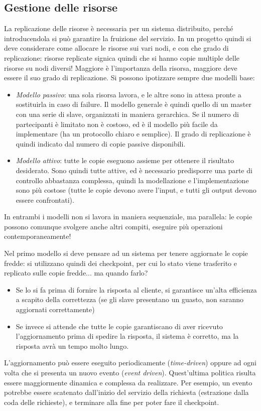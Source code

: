 \subsection{Gestione delle risorse}
La replicazione delle risorse è necessaria per un sistema distribuito, perché introducendola si può garantire la
fruizione del servizio. In un progetto quindi si deve considerare come allocare le risorse sui vari nodi, e con che
grado di replicazione: risorse replicate signica quindi che si hanno copie multiple delle risorse su nodi diversi!
Maggiore è l'importanza della risorsa, maggiore deve essere il suo grado di replicazione.
Si possono ipotizzare sempre due modelli base:
\begin{itemize}
 \item \textit{Modello passivo}: una sola risorsa lavora, e le altre sono in attesa pronte a sostituirla in caso di
 failure. Il modello generale è quindi quello di un master con una serie di slave, organizzati in maniera gerarchica.
 Se il numero di partecipanti è limitato non è costoso, ed è il modello più facile da implementare (ha un protocollo
 chiaro e semplice). Il grado di replicazione è quindi indicato dal numero di copie passive disponibili.
 \item \textit{Modello attivo}: tutte le copie eseguono assieme per ottenere il risultato desiderato. Sono quindi tutte
 attive, ed è necessario predisporre una parte di controllo abbastanza complessa, quindi la modellazione e
 l'implementazione sono più costose (tutte le copie devono avere l'input, e tutti gli output devono essere confrontati).
\end{itemize}
In entrambi i modelli non si lavora in maniera sequenziale, ma parallela: le copie possono comunque svolgere anche 
altri compiti, eseguire più operazioni contemporaneamente!

Nel primo modello si deve pensare ad un sistema per tenere aggiornate le copie fredde: si utilizzano quindi dei
checkpoint, per cui lo stato viene trasferito e replicato sulle copie fredde... ma quando farlo?
\begin{itemize}
 \item Se lo si fa prima di fornire la risposta al cliente, si garantisce un'alta efficienza a scapito della 
 correttezza (se gli slave presentano un guasto, non saranno aggiornati correttamente)
 \item Se invece si attende che tutte le copie garantiscano di aver ricevuto l'aggiornamento prima di spedire la
 risposta, il sistema è corretto, ma la risposta avrà un tempo molto lungo.
\end{itemize}
L'aggiornamento può essere eseguito periodicamente (\textit{time-driven}) oppure ad ogni volta che si presenta un nuovo
evento (\textit{event driven}). Quest'ultima politica risulta essere maggiormente dinamica e complessa da realizzare.
Per esempio, un evento potrebbe essere scatenato dall'inizio del servizio della richiesta (estrazione dalla coda delle
richieste), e terminare alla fine per poter fare il checkpoint.

